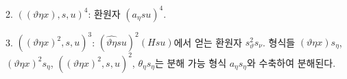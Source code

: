 
2. $((\vartheta\eta x),s,u)^4$: 환원자 $(a_\eta su)^4$.

3. $((\vartheta\eta x)^2,s,u)^3$: $(\widehat{\vartheta\eta}su)^2(Hsu)$에서 얻는 환원자 $s_\vartheta^2s_\nu$.
형식들 $(\vartheta\eta x)s_\eta$, $(\vartheta\eta x)^2s_\eta$, $((\vartheta\eta x)^2,s,u)^2$, $\theta_\eta s_\eta$는 분해 가능 형식 $a_\eta s_\eta$와 수축하여 분해된다.


